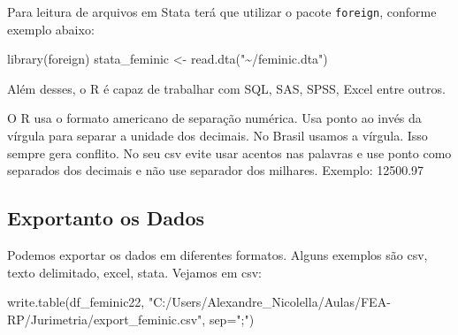 \documentclass[
  letterpaper,
  DIV=11,
  numbers=noendperiod]{scrreprt}
\newenvironment{Shaded}{\begin{snugshade}}{\end{snugshade}}
\newcommand{\AttributeTok}[1]{\textcolor[rgb]{0.40,0.45,0.13}{#1}}
\newcommand{\FunctionTok}[1]{\textcolor[rgb]{0.28,0.35,0.67}{#1}}
\newcommand{\NormalTok}[1]{\textcolor[rgb]{0.00,0.23,0.31}{#1}}
\newcommand{\OtherTok}[1]{\textcolor[rgb]{0.00,0.23,0.31}{#1}}
\newcommand{\StringTok}[1]{\textcolor[rgb]{0.13,0.47,0.30}{#1}}
\begin{document}
Para leitura de arquivos em Stata terá que utilizar o pacote
\texttt{foreign}, conforme exemplo abaixo:

\begin{Shaded}
\begin{Highlighting}[]
\FunctionTok{library}\NormalTok{(foreign)}
\NormalTok{stata\_feminic }\OtherTok{\textless{}{-}} \FunctionTok{read.dta}\NormalTok{(}\StringTok{"\textasciitilde{}/feminic.dta"}\NormalTok{)}
\end{Highlighting}
\end{Shaded}

Além desses, o R é capaz de trabalhar com SQL, SAS, SPSS, Excel entre
outros.

\begin{tcolorbox}[enhanced jigsaw, leftrule=.75mm, coltitle=black, colframe=quarto-callout-warning-color-frame, toprule=.15mm, opacitybacktitle=0.6, bottomtitle=1mm, bottomrule=.15mm, titlerule=0mm, toptitle=1mm, title=\textcolor{quarto-callout-warning-color}{\faExclamationTriangle}\hspace{0.5em}{Cuidado com o Ponto}, arc=.35mm, breakable, opacityback=0, colbacktitle=quarto-callout-warning-color!10!white, colback=white, left=2mm, rightrule=.15mm]

O R usa o formato americano de separação numérica. Usa ponto ao invés da
vírgula para separar a unidade dos decimais. No Brasil usamos a vírgula.
Isso sempre gera conflito. No seu csv evite usar acentos nas palavras e
use ponto como separados dos decimais e não use separador dos milhares.
Exemplo: 12500.97

\end{tcolorbox}

\subsection{Exportanto os Dados}\label{exportanto-os-dados}

Podemos exportar os dados em diferentes formatos. Alguns exemplos são
csv, texto delimitado, excel, stata. Vejamos em csv:

\begin{Shaded}
\begin{Highlighting}[]
\FunctionTok{write.table}\NormalTok{(df\_feminic22, }\StringTok{"C:/Users/Alexandre\_Nicolella/Aulas/FEA{-}RP/Jurimetria/export\_feminic.csv"}\NormalTok{, }\AttributeTok{sep=}\StringTok{";"}\NormalTok{)}
\end{Highlighting}
\end{Shaded}
\end{document}
